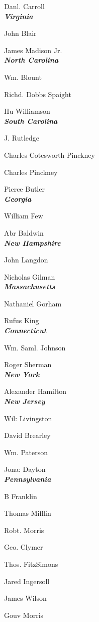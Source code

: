 Danl. Carroll\\[0.01in]

\textbf{\textit{Virginia}}

John Blair

James Madison Jr.\\[0.01in]

\textbf{\textit{North Carolina}}

Wm. Blount

Richd. Dobbs Spaight

Hu Williamson\\[0.01in]

\textbf{\textit{South Carolina}}

J. Rutledge

Charles Cotesworth Pinckney

Charles Pinckney

Pierce Butler\\[0.01in]

\textbf{\textit{Georgia}}

William Few

Abr Baldwin\\[0.01in]

\textbf{\textit{New Hampshire}}

John Langdon

Nicholas Gilman\\[0.01in]

\textbf{\textit{Massachusetts}}

Nathaniel Gorham

Rufus King\\[0.01in]

\textbf{\textit{Connecticut}}

Wm. Saml. Johnson

Roger Sherman\\[0.01in]

\textbf{\textit{New York}}

Alexander Hamilton\\[0.01in]

\textbf{\textit{New Jersey}}

Wil: Livingston

David Brearley

Wm. Paterson

Jona: Dayton\\[0.01in]

\textbf{\textit{Pennsylvania}}

B Franklin

Thomas Mifflin

Robt. Morris

Geo. Clymer

Thos. FitzSimons

Jared Ingersoll

James Wilson

Gouv Morris




